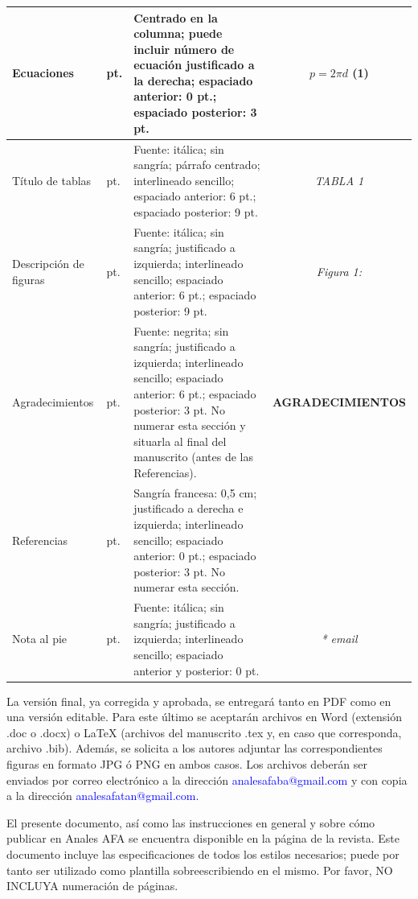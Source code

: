 \documentclass{analesafa}
\begin{document}
\begin{table}[ht]
\begin{tabular}{|m{2cm}|m{1.5cm}|m{7.8cm}|c|}
    \hline
    \centering Ecuaciones & \centering 10 pt.  &  Centrado en la columna; puede incluir número de ecuación justificado a la derecha; espaciado anterior: 0 pt.; espaciado posterior: 3 pt.  &  $p= 2\pi d$ \hspace{0.5cm}  (1)  \\
    \hline
    \centering Título de tablas  & \centering 10 pt.  & Fuente: itálica; sin sangría; párrafo centrado; interlineado sencillo; espaciado anterior: 6 pt.; espaciado posterior: 9 pt.  &  \textit{TABLA 1}  \\
    \hline
    \centering Descripción de figuras  & \centering 9 pt.  &  Fuente: itálica; sin sangría; justificado a izquierda; interlineado sencillo; espaciado anterior: 6 pt.; espaciado posterior: 9 pt.  &  \textit{Figura 1:}  \\
    \hline
    \centering Agradecimientos & \centering 10 pt. &  Fuente: negrita; sin sangría; justificado a izquierda; interlineado sencillo; espaciado anterior: 6 pt.; espaciado posterior: 3 pt. No numerar  esta sección y situarla al final del manuscrito (antes de las Referencias). &  \textbf{AGRADECIMIENTOS}\\
    \hline
    \centering Referencias & \centering 9 pt. & Sangría francesa: 0,5 cm; justificado a derecha e izquierda; interlineado sencillo; espaciado anterior: 0 pt.; espaciado posterior: 3 pt. No numerar esta sección.   &    \\
    \hline
    \centering Nota al pie  &  \centering 9 pt.  & Fuente: itálica; sin sangría; justificado a izquierda; interlineado sencillo; espaciado anterior y posterior: 0 pt.  &  \small{\textit{* email}}   \\
    \hline
    \end{tabular}
\end{table}

\normalsize

La versión final, ya corregida y aprobada, se entregará tanto en PDF como en una versión editable. Para este último se aceptarán archivos en Word (extensión .doc o .docx) o \LaTeX{ }  (archivos del manuscrito .tex y, en caso que corresponda, archivo .bib). Además, se solicita a los autores adjuntar las correspondientes figuras en formato JPG ó PNG en ambos casos. Los archivos deberán ser enviados por correo electrónico a la dirección \textcolor{blue}{analesafaba@gmail.com}  y con copia a la dirección \textcolor{blue}{analesafatan@gmail.com}.

El presente documento, así como las instrucciones en general y sobre cómo publicar en Anales AFA se encuentra disponible en la página de la revista. Este documento incluye las especificaciones de todos los estilos necesarios; puede por tanto ser utilizado como plantilla sobreescribiendo en el mismo. Por favor, NO INCLUYA numeración de páginas.
\end{document}
